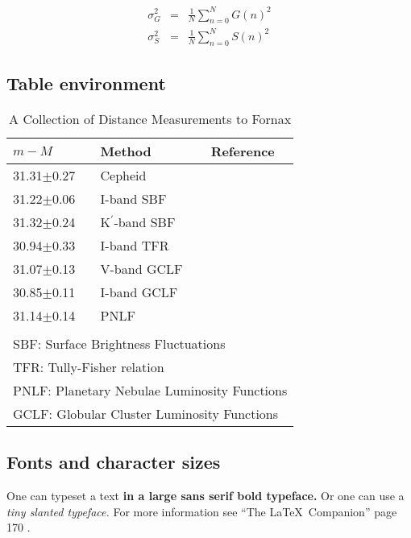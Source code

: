 \documentclass[11pt,a4paper]{emulateapj}
\begin{document}
\begin{eqnarray}
  \sigma_G^2 &=& \frac{1}{N}\sum_{n=0}^{N}G(n)^2 \\
  \sigma_S^2 &=& \frac{1}{N}\sum_{n=0}^{N}S(n)^2 
\end{eqnarray}

%
%
\subsection{Table environment}
%
%

%
%
\begin{table}
  \caption{A Collection of Distance Measurements to Fornax}
  \label{tab:distance}
  \begin{center}
    \leavevmode
    \begin{tabular}{lll} \hline \hline              
  $m-M$          & Method              & Reference      \\ \hline 
  31.31$\pm$0.27 & Cepheid             & \citet{sil98}  \\
  31.22$\pm$0.06 & I-band SBF          & \citet{jen98}  \\
  31.32$\pm$0.24 & K$^\prime$-band SBF & \citet{jen98}  \\
  30.94$\pm$0.33 & I-band TFR          & \citet{bure96} \\
  31.07$\pm$0.13 & V-band GCLF         & \citet{Koh96}  \\
  30.85$\pm$0.11 & I-band GCLF         & \citet{Koh96}  \\
  31.14$\pm$0.14 & PNLF                & \citet{mcm93}  \\ \hline
  \multicolumn{3}{l}{}                                             \\       
  \multicolumn{3}{l}{SBF: Surface Brightness Fluctuations}         \\
  \multicolumn{3}{l}{TFR: Tully-Fisher relation}                   \\
  \multicolumn{3}{l}{PNLF: Planetary Nebulae Luminosity Functions} \\
  \multicolumn{3}{l}{GCLF: Globular Cluster Luminosity Functions}  \\
    \end{tabular}
  \end{center}
\end{table}

%
%
\subsection{Fonts and character sizes}
%
%
One can typeset a text {\sffamily\bfseries\large in a large sans serif
  bold typeface.} Or one can use a {\slshape\tiny tiny slanted
  typeface.} For more information see ``The \LaTeX\ Companion'' page
170 .
\end{document}
